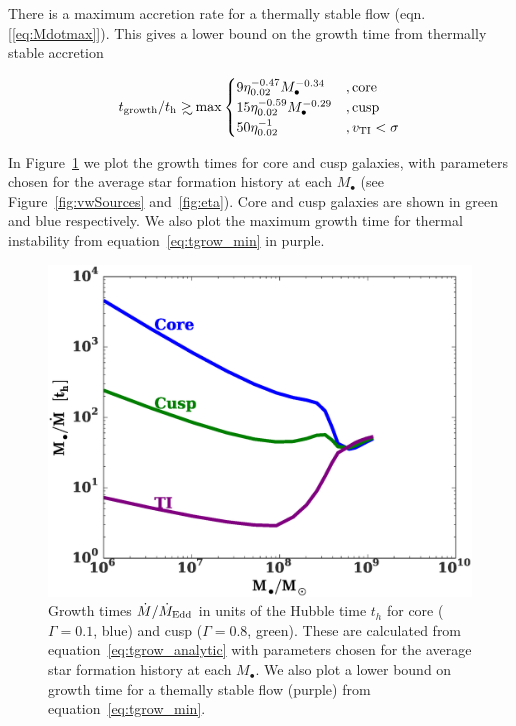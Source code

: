 \documentclass[usenatbib,fleqn]{mn2e}
\newcommand{\Mdot}{\dot{M}}
\newcommand{\MdotEdd}{\dot{M}_{\rm Edd}}
\newcommand\gsim{\mathrel{\rlap{\lower4pt\hbox{\hskip1pt$\sim$}}
    \raise1pt\hbox{$>$}}}
\newcommand{\Mbh}[1][]{M_{\bullet#1}}
\renewcommand{\th}{t_h}
\begin{document}
There is a maximum accretion rate for a thermally stable flow
(eqn. [\ref{eq:Mdotmax}]). This gives a lower bound on the growth
time from thermally stable accretion

\begin{align}
  t_{\rm growth}/t_{\rm h} \gsim
  \rm{max}\begin{cases}
    9 \eta_{0.02}^{-0.47} \Mbh^{-0.34} &, \text{core}\\
    15 \eta_{0.02}^{-0.59} \Mbh^{-0.29} &, \text{cusp}\\
    50  \eta_{0.02}^{-1} &, v_{\rm TI} < \sigma
  \end{cases}
  \label{eq:tgrow_min}
\end{align}

In Figure~\ref{fig:bh_growth} we plot the growth times for core and
cusp galaxies, with parameters chosen for the average star formation
history at each $\Mbh$ (see Figure~\ref{fig:vwSources}
and~\ref{fig:eta}). Core and cusp galaxies are shown in green and blue
respectively.  We also plot the maximum growth time for thermal
instability from equation~\eqref{eq:tgrow_min} in purple.

\begin{figure}
\includegraphics[width=\columnwidth]{bh_growth.eps}
\caption{\label{fig:bh_growth} Growth times $\Mdot/\MdotEdd$ in units
  of the Hubble time $\th$ for core ($\Gamma=0.1$, blue) and cusp
  ($\Gamma=0.8$, green). These are calculated from
  equation~\ref{eq:tgrow_analytic} with parameters chosen for the
  average star formation history at each $\Mbh$. We also plot a lower
  bound on growth time for a themally stable flow (purple) from
  equation~\eqref{eq:tgrow_min}.}
\end{figure}
\end{document}
